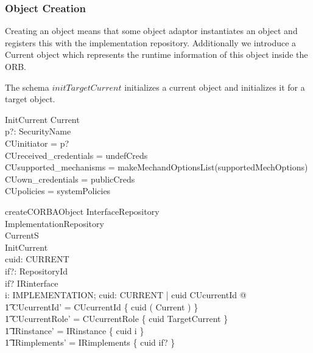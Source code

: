 \subsubsection{Object Creation}
Creating an object means that some object adaptor instantiates an object and
registers this with the implementation repository.  Additionally we introduce a
Current object which represents the runtime information of this \corba{} object
inside the ORB.

The schema $initTargetCurrent$ initializes a current object and initializes it
for a target object.
\begin{schema}{InitCurrent}
  Current \\
  p?: SecurityName \\
  \where
  CUinitiator = p? \\
  CUreceived\_credentials = undefCreds \\
  CUsupported\_mechanisms = makeMechandOptionsList(supportedMechOptions) \\
  CUown\_credentials = \langle publicCreds \rangle \\
  CUpolicies = systemPolicies \\
\end{schema}
\begin{schema}{createCORBAObject}
  \Xi InterfaceRepository \\
  \Delta ImplementationRepository \\
  \Delta CurrentS \\
  InitCurrent \\
  cuid: CURRENT \\
  if?: RepositoryId \\
  \where
  if? \in \dom IRinterface \\
  \exists i: IMPLEMENTATION; cuid: CURRENT | cuid \notin \dom CUcurrentId @ \\
  \t1 CUcurrentId' = CUcurrentId \cup \{ cuid \mapsto ( \theta Current ) \} \\
  \t1 \land CUcurrentRole' = CUcurrentRole \cup \{ cuid \mapsto TargetCurrent \} \\
  \t1 \land IRinstance' = IRinstance \cup \{ cuid \mapsto i \} \\
  \t1 \land IRimplements' = IRimplements \cup \{ cuid \mapsto if? \} \\
\end{schema}


